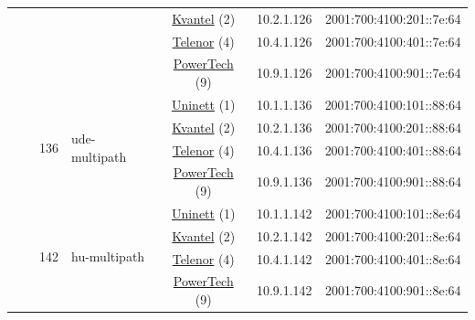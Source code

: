 \begin{small}
\begin{center}
\begin{longtable}{|c|c|c|c|c|c|c|c|}
  &  &  &  & \multicolumn{2}{|c|}{\tiny{\href{http://kvantel.no}{Kvantel} (2)}} & \tiny{10.2.1.126} & \tiny{2001:700:4100:201::7e:64} \\* \cline{5-5}\cline{6-6}\cline{7-7}\cline{8-8}
  &  &  &  & \multicolumn{2}{|c|}{\tiny{\href{https://www.telenor.no}{Telenor} (4)}} & \tiny{10.4.1.126} & \tiny{2001:700:4100:401::7e:64} \\* \cline{5-5}\cline{6-6}\cline{7-7}\cline{8-8}
  &  &  &  & \multicolumn{2}{|c|}{\tiny{\href{http://www.powertech.no}{PowerTech} (9)}} & \tiny{10.9.1.126} & \tiny{2001:700:4100:901::7e:64} \\* \cline{3-3}\cline{4-4}\cline{5-5}\cline{6-6}\cline{7-7}\cline{8-8}
  &  & \multirow{4}{*}{\tiny{136}} & \multicolumn{1}{|l|}{\multirow{4}{*}{\tiny{ude-multipath}}} & \multicolumn{2}{|c|}{\tiny{\href{https://www.uninett.no}{Uninett} (1)}} & \tiny{10.1.1.136} & \tiny{2001:700:4100:101::88:64} \\* \cline{5-5}\cline{6-6}\cline{7-7}\cline{8-8}
  &  &  &  & \multicolumn{2}{|c|}{\tiny{\href{http://kvantel.no}{Kvantel} (2)}} & \tiny{10.2.1.136} & \tiny{2001:700:4100:201::88:64} \\* \cline{5-5}\cline{6-6}\cline{7-7}\cline{8-8}
  &  &  &  & \multicolumn{2}{|c|}{\tiny{\href{https://www.telenor.no}{Telenor} (4)}} & \tiny{10.4.1.136} & \tiny{2001:700:4100:401::88:64} \\* \cline{5-5}\cline{6-6}\cline{7-7}\cline{8-8}
  &  &  &  & \multicolumn{2}{|c|}{\tiny{\href{http://www.powertech.no}{PowerTech} (9)}} & \tiny{10.9.1.136} & \tiny{2001:700:4100:901::88:64} \\* \cline{3-3}\cline{4-4}\cline{5-5}\cline{6-6}\cline{7-7}\cline{8-8}
  &  & \multirow{4}{*}{\tiny{142}} & \multicolumn{1}{|l|}{\multirow{4}{*}{\tiny{hu-multipath}}} & \multicolumn{2}{|c|}{\tiny{\href{https://www.uninett.no}{Uninett} (1)}} & \tiny{10.1.1.142} & \tiny{2001:700:4100:101::8e:64} \\* \cline{5-5}\cline{6-6}\cline{7-7}\cline{8-8}
  &  &  &  & \multicolumn{2}{|c|}{\tiny{\href{http://kvantel.no}{Kvantel} (2)}} & \tiny{10.2.1.142} & \tiny{2001:700:4100:201::8e:64} \\* \cline{5-5}\cline{6-6}\cline{7-7}\cline{8-8}
  &  &  &  & \multicolumn{2}{|c|}{\tiny{\href{https://www.telenor.no}{Telenor} (4)}} & \tiny{10.4.1.142} & \tiny{2001:700:4100:401::8e:64} \\* \cline{5-5}\cline{6-6}\cline{7-7}\cline{8-8}
  &  &  &  & \multicolumn{2}{|c|}{\tiny{\href{http://www.powertech.no}{PowerTech} (9)}} & \tiny{10.9.1.142} & \tiny{2001:700:4100:901::8e:64} \\* \cline{3-3}\cline{4-4}\cline{5-5}\cline{6-6}\cline{7-7}\cline{8-8}

\end{longtable}
\end{center}
\end{small}
